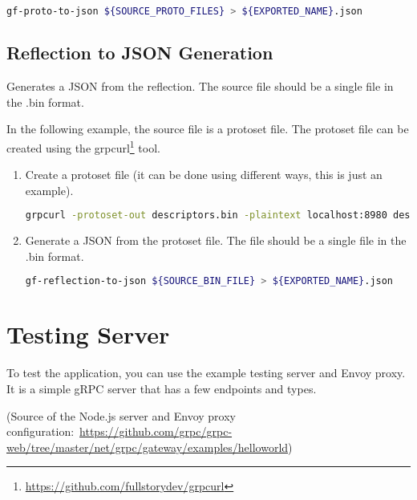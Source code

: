 \begin{lstlisting}[language=bash, label={lst:documentation-generator-proto}]
gf-proto-to-json ${SOURCE_PROTO_FILES} > ${EXPORTED_NAME}.json
\end{lstlisting}

\subsection{Reflection to JSON Generation}
Generates a JSON from the reflection.
The source file should be a single file in the .bin format.

In the following example, the source file is a protoset file.
The protoset file can be created using the grpcurl\footnote{\url{https://github.com/fullstorydev/grpcurl}} tool.

\begin{enumerate}
    \item Create a protoset file (it can be done using different ways, this is just an example).
    \begin{lstlisting}[language=bash, label={lst:documentation-generator-reflection-grpcurl}, breaklines=true]
grpcurl -protoset-out descriptors.bin -plaintext localhost:8980 describe
    \end{lstlisting}


    \item Generate a JSON from the protoset file.
    The file should be a single file in the .bin format.

    \begin{lstlisting}[language=bash, label={lst:documentation-generator-reflection-bin}]
gf-reflection-to-json ${SOURCE_BIN_FILE} > ${EXPORTED_NAME}.json
    \end{lstlisting}


\end{enumerate}


\section{Testing Server}
To test the application, you can use the example testing server and Envoy proxy.
It is a simple gRPC server that has a few endpoints and types.

(Source of the Node.js server and Envoy proxy configuration:~\url{https://github.com/grpc/grpc-web/tree/master/net/grpc/gateway/examples/helloworld})

